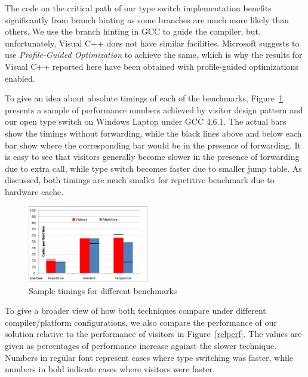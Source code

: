 \noindent
The code on the critical path of our type switch implementation benefits 
significantly from branch hinting as some branches are much more likely than 
others. We use the branch hinting in GCC to guide the compiler, but, 
unfortunately, Visual C++ does not have similar facilities. Microsoft suggests 
to use \emph{Profile-Guided Optimization} to achieve the same, which is why the 
results for Visual C++ reported here have been obtained with profile-guided 
optimizations enabled. %

To give an idea about absolute timings of each of the benchmarks, 
Figure~\ref{fig:VisitorsComparison} presents a sample of performance numbers 
achieved by visitor design pattern and our open type switch on Windows Laptop 
under GCC 4.6.1. The actual bars show the timings without forwarding, while the 
black lines above and below each bar show where the corresponding bar would be 
in the presence of forwarding. It is easy to see that visitors generally become 
slower in the presence of forwarding due to extra call, while type switch 
becomes faster due to smaller jump table. As discussed, both timings are much 
smaller for repetitive benchmark due to hardware cache.

\begin{figure}[htbp]
  \centering
    \includegraphics[width=0.47\textwidth]{VisitorsCompare.png}
  \caption{Sample timings for different benchmarks}
  \label{fig:VisitorsComparison}
\end{figure}

To give a broader view of how both techniques compare under different 
compiler/platform configurations, we also compare the performance of our 
solution relative to the performance of visitors in Figure~\ref{relperf}. The 
values are given as percentages of performance increase against the slower 
technique. Numbers in regular font represent cases where type switching was 
faster, while numbers in bold indicate cases where visitors were faster.

